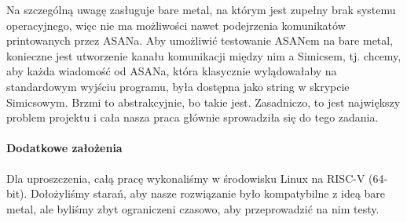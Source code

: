 \documentclass[../main.tex]{subfiles}
\begin{document}
Na szczególną uwagę zasługuje bare metal, na którym jest zupełny brak systemu
operacyjnego, więc nie ma możliwości nawet podejrzenia komunikatów printowanych
przez ASANa. Aby umożliwić testowanie ASANem na bare metal, konieczne jest
utworzenie kanału komunikacji między nim a Simicsem, tj. chcemy, aby każda
wiadomość od ASANa, która klasycznie wylądowałaby na standardowym wyjściu
programu, była dostępna jako string w skrypcie Simicsowym. Brzmi to
abstrakcyjnie, bo takie jest. Zasadniczo, to jest największy problem projektu i
cała nasza praca głównie sprowadziła się do tego zadania.

\paragraph{Dodatkowe założenia}
Dla uproszczenia, całą pracę wykonaliśmy w środowisku Linux na RISC-V (64-bit).
Dołożyliśmy starań, aby nasze rozwiązanie było kompatybilne z ideą bare metal,
ale byliśmy zbyt ograniczeni czasowo, aby przeprowadzić na nim testy.
\end{document}
